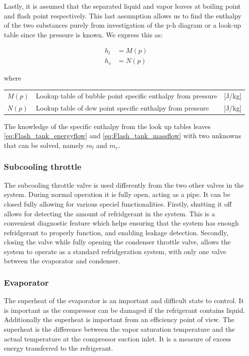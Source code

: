 Lastly, it is assumed that the separated liquid and vapor leaves at boiling point and flash point respectively. This last assumption allows us to find the enthalpy of the two substances purely from investigation of the p-h diagram or a look-up table since the pressure is known. We express this as:

\begin{align}
	h_{l}  & = M(p)\\
	h_{v}  & = N(p)
\end{align}

where

\begin{center}
	\begin{tabular}{l p{8cm} l}
		$M(p)$ & Lookup table of bubble point specific enthalpy from pressure & [\si{J}/\si{kg}] \\
		$N(p)$ & Lookup table of dew point specific enthalpy from pressure    & [\si{J}/\si{kg}]
	\end{tabular}
\end{center}

The knowledge of the specific enthalpy from the look up tables leaves \cref{eq:Flash_tank_energyflow} and \cref{eq:Flash_tank_massflow} with two unknowns that can be solved, namely $ m_l $ and $ m_v $.

\subsubsection{Subcooling throttle}
The subcooling throttle valve is used differently from the two other valves in the system. During normal operation it is fully open, acting as a pipe. It can be closed fully allowing for various speciel functionalities. Firstly, shutting it off allows for detecting the amount of refridgerant in the system. This is a convenient diagnostic feature which helps ensuring that the system has enough refridgerant to properly function, and enabling leakage detection. Secondly, closing the valve while fully opening the condenser throttle valve, allows the system to operate as a standard refridgeration system, with only one valve between the evaporator and condenser.


\subsubsection{Evaporator}
The superheat of the evaporator is an important and difficult state to control. It is important as the compressor can be damaged if the refrigerant contains liquid. Additionally the superheat is important from an efficiency point of view.
The superheat is the difference between the vapor saturation temperature and the actual temperature at the compressor suction inlet. It is a measure of excess energy transferred to the refrigerant.

